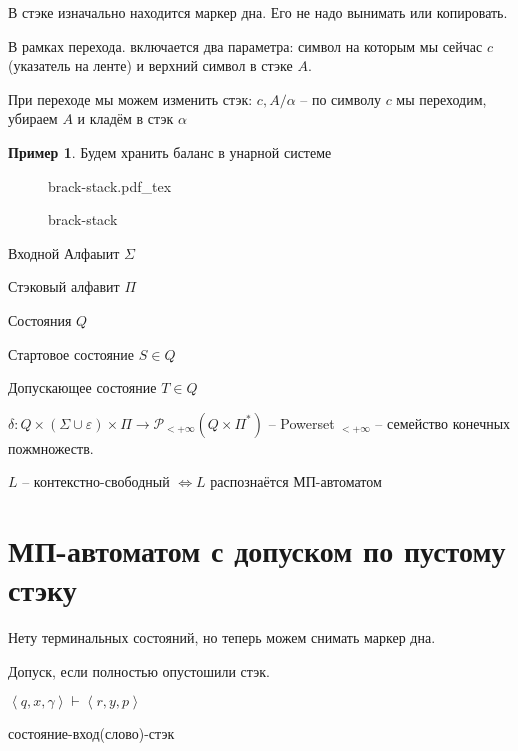 \documentclass{book}
\theoremstyle{definition}
\newtheorem*{example}{Пример}
\newcommand{\incfig}[1]{%
    \def\svgwidth{\columnwidth}
    {#1.pdf_tex}
}
\begin{document}
    В стэке изначально находится маркер дна. Его не надо вынимать или копировать.

    В рамках перехода. включается два параметра: символ на которым мы сейчас $c$ (указатель на ленте) и верхний символ в стэке $A$.

    При переходе мы можем изменить стэк: $c, A/\alpha$ -- по символу $c$ мы переходим, убираем  $A$ и кладём в стэк  $\alpha$

    \begin{example}
        Будем хранить баланс в унарной системе

\begin{figure}[!ht]
    \centering
    \incfig{brack-stack}
    \caption{brack-stack}
    \label{fig:brack-stack}
\end{figure}
    \end{example}

    Входной Алфаыит $\Sigma$

    Стэковый алфавит  $\Pi$

    Состояния $Q$

    Стартовое состояние $S \in Q$

    Допускающее состояние  $T \in Q$

    $\delta:Q\times \left( \Sigma \cup \varepsilon \right) \times \Pi \to \mathscr{P_{<+\infty }}( Q\times \Pi^*)$ -- Powerset $_{<+\infty }$ -- семейство конечных пожмножеств.


    \begin{theorem}
        $L$ -- контекстно-свободный  $\iff L$ распознаётся МП-автоматом
    \end{theorem}

    \section{МП-автоматом с допуском по пустому стэку}

    \begin{definition}
        Нету терминальных состояний, но теперь можем снимать маркер дна.

        Допуск, если полностью опустошили стэк.
    \end{definition}

    \begin{definition}

        $\left<q, x, \gamma \right> \vdash \left< r, y, p\right>$

        состояние-вход(слово)-стэк
    \end{definition}
\end{document}
